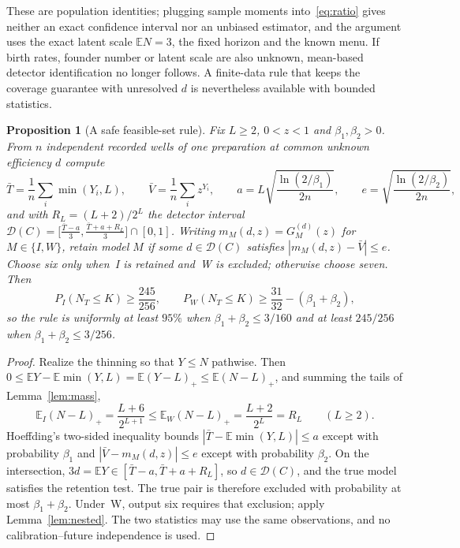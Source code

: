 \documentclass[11pt,a4paper]{article}
\theoremstyle{plain}
\newtheorem{proposition}[theorem]{Proposition}
\theoremstyle{definition}
\theoremstyle{remark}
\newcommand{\EE}{\mathbb E}
\begin{document}
These are population identities; plugging sample moments into~\eqref{eq:ratio} gives neither an exact confidence interval nor an unbiased estimator, and the argument uses the exact latent scale $\EE N=3$, the fixed horizon and the known menu. If birth rates, founder number or latent scale are also unknown, mean-based detector identification no longer follows. A finite-data rule that keeps the coverage guarantee with unresolved $d$ is nevertheless available with bounded statistics.

\begin{proposition}[A safe feasible-set rule]\label{prop:feasible}
Fix $L\ge2$, $0<z<1$ and $\beta_1,\beta_2>0$. From $n$ independent recorded wells of one preparation at common unknown efficiency $d$ compute
\[
\bar T=\frac1n\sum_i\min(Y_i,L),\qquad \bar V=\frac1n\sum_iz^{Y_i},\qquad a=L\sqrt{\frac{\ln(2/\beta_1)}{2n}},\qquad e=\sqrt{\frac{\ln(2/\beta_2)}{2n}},
\]
and with $R_L=(L+2)/2^L$ the detector interval $\mathcal D(C)=\bigl[\tfrac{\bar T-a}3,\tfrac{\bar T+a+R_L}3\bigr]\cap[0,1]$. Writing $m_M(d,z)=G^{(d)}_M(z)$ for $M\in\{I,W\}$, retain model $M$ if some $d\in\mathcal D(C)$ satisfies $|m_M(d,z)-\bar V|\le e$. Choose six only when~I is retained and~W is excluded; otherwise choose seven. Then
\begin{equation}\label{eq:feasible}
P_I(N_T\le K)\ge\frac{245}{256},\qquad P_W(N_T\le K)\ge\frac{31}{32}-(\beta_1+\beta_2),
\end{equation}
so the rule is uniformly at least $95\%$ when $\beta_1+\beta_2\le3/160$ and at least $245/256$ when $\beta_1+\beta_2\le3/256$.
\end{proposition}
\begin{proof}
Realize the thinning so that $Y\le N$ pathwise. Then $0\le\EE Y-\EE\min(Y,L)=\EE(Y-L)_+\le\EE(N-L)_+$, and summing the tails of Lemma~\ref{lem:mass},
\begin{equation}\label{eq:remainder}
\EE_I(N-L)_+=\frac{L+6}{2^{L+1}}\le\EE_W(N-L)_+=\frac{L+2}{2^L}=R_L\qquad(L\ge2).
\end{equation}
Hoeffding's two-sided inequality bounds $|\bar T-\EE\min(Y,L)|\le a$ except with probability $\beta_1$ and $|\bar V-m_M(d,z)|\le e$ except with probability $\beta_2$. On the intersection, $3d=\EE Y\in[\bar T-a,\bar T+a+R_L]$, so $d\in\mathcal D(C)$, and the true model satisfies the retention test. The true pair is therefore excluded with probability at most $\beta_1+\beta_2$. Under~W, output six requires that exclusion; apply Lemma~\ref{lem:nested}. The two statistics may use the same observations, and no calibration--future independence is used.
\end{proof}
\end{document}
